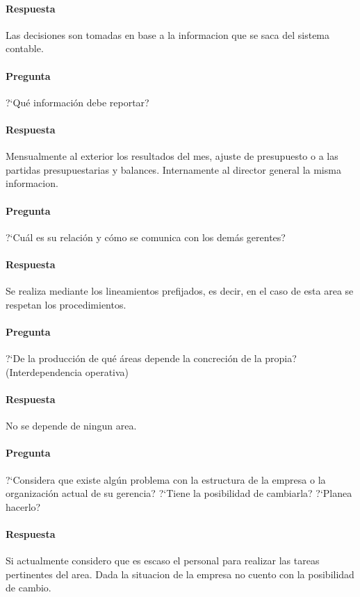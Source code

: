 \documentclass[12pt,a4paper,spanish]{article}
\begin{document}
	\paragraph{Respuesta}
Las decisiones son tomadas en base a la informacion que se saca del sistema contable.
	
	\paragraph{Pregunta}
	 ?`Qu\'e informaci\'on debe reportar?
	\paragraph{Respuesta}
Mensualmente al exterior los resultados del mes, ajuste de presupuesto o a las partidas presupuestarias y balances.
Internamente al director general la misma informacion.

	\paragraph{Pregunta}
	 ?`Cu\'al es su relaci\'on y c\'omo se comunica con los dem\'as gerentes?
	\paragraph{Respuesta}
Se realiza mediante los lineamientos prefijados, es decir, en el caso de esta area se respetan los procedimientos.

	\paragraph{Pregunta}
	 ?`De la producci\'on de qu\'e \'areas depende la concreci\'on de la propia? (Interdependencia operativa)
	\paragraph{Respuesta}
No se depende de ningun area.

	\paragraph{Pregunta}
	 ?`Considera que existe alg\'un problema con la estructura de la empresa o la organizaci\'on actual de su gerencia?  ?`Tiene la posibilidad de cambiarla?  ?`Planea hacerlo?
	\paragraph{Respuesta}
Si actualmente considero que es escaso el personal para realizar las tareas pertinentes del area.
Dada la situacion de la empresa no cuento con la posibilidad de cambio.
\end{document}
